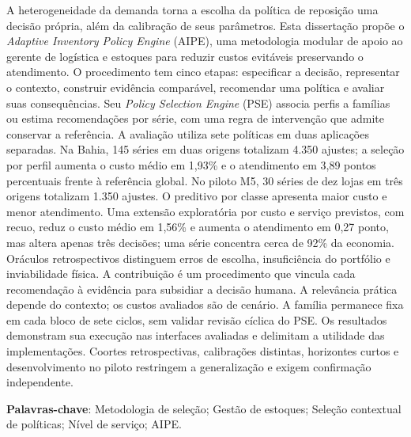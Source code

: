 A heterogeneidade da demanda torna a escolha da política de reposição uma decisão própria, além da calibração de seus parâmetros. Esta dissertação propõe o \textit{Adaptive Inventory Policy Engine} (AIPE), uma metodologia modular de apoio ao gerente de logística e estoques para reduzir custos evitáveis preservando o atendimento. O procedimento tem cinco etapas: especificar a decisão, representar o contexto, construir evidência comparável, recomendar uma política e avaliar suas consequências. Seu \textit{Policy Selection Engine} (PSE) associa perfis a famílias ou estima recomendações por série, com uma regra de intervenção que admite conservar a referência. A avaliação utiliza sete políticas em duas aplicações separadas. Na Bahia, 145 séries em duas origens totalizam 4.350 ajustes; a seleção por perfil aumenta o custo médio em 1,93\% e o atendimento em 3,89 pontos percentuais frente à referência global. No piloto M5, 30 séries de dez lojas em três origens totalizam 1.350 ajustes. O preditivo por classe apresenta maior custo e menor atendimento. Uma extensão exploratória por custo e serviço previstos, com recuo, reduz o custo médio em 1,56\% e aumenta o atendimento em 0,27 ponto, mas altera apenas três decisões; uma série concentra cerca de 92\% da economia. Oráculos retrospectivos distinguem erros de escolha, insuficiência do portfólio e inviabilidade física. A contribuição é um procedimento que vincula cada recomendação à evidência para subsidiar a decisão humana. A relevância prática depende do contexto; os custos avaliados são de cenário. A família permanece fixa em cada bloco de sete ciclos, sem validar revisão cíclica do PSE. Os resultados demonstram sua execução nas interfaces avaliadas e delimitam a utilidade das implementações. Coortes retrospectivas, calibrações distintas, horizontes curtos e desenvolvimento no piloto restringem a generalização e exigem confirmação independente.

\vspace{2em}
\textbf{Palavras-chave}: Metodologia de seleção; Gestão de estoques; Seleção contextual de políticas; Nível de serviço; AIPE.
